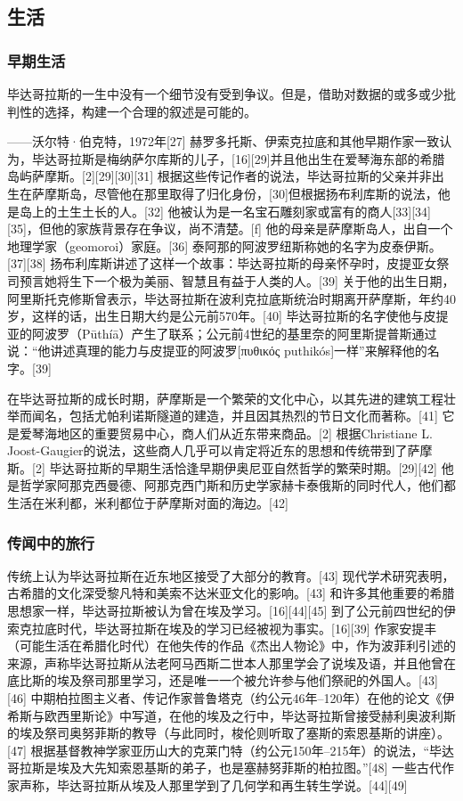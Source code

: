 \subsection{生活}  
\subsubsection{早期生活}  
毕达哥拉斯的一生中没有一个细节没有受到争议。但是，借助对数据的或多或少批判性的选择，构建一个合理的叙述是可能的。

——沃尔特·伯克特，1972年[27]  
赫罗多托斯、伊索克拉底和其他早期作家一致认为，毕达哥拉斯是梅纳萨尔库斯的儿子，[16][29]并且他出生在爱琴海东部的希腊岛屿萨摩斯。[2][29][30][31] 根据这些传记作者的说法，毕达哥拉斯的父亲并非出生在萨摩斯岛，尽管他在那里取得了归化身份，[30]但根据扬布利库斯的说法，他是岛上的土生土长的人。[32] 他被认为是一名宝石雕刻家或富有的商人[33][34][35]，但他的家族背景存在争议，尚不清楚。[f] 他的母亲是萨摩斯岛人，出自一个地理学家（geomoroi）家庭。[36] 泰阿那的阿波罗纽斯称她的名字为皮泰伊斯。[37][38] 扬布利库斯讲述了这样一个故事：毕达哥拉斯的母亲怀孕时，皮提亚女祭司预言她将生下一个极为美丽、智慧且有益于人类的人。[39] 关于他的出生日期，阿里斯托克修斯曾表示，毕达哥拉斯在波利克拉底斯统治时期离开萨摩斯，年约40岁，这样的话，出生日期大约是公元前570年。[40] 毕达哥拉斯的名字使他与皮提亚的阿波罗（Pūthíā）产生了联系；公元前4世纪的基里奈的阿里斯提普斯通过说：“他讲述真理的能力与皮提亚的阿波罗[πυθικός puthikós]一样”来解释他的名字。[39]

在毕达哥拉斯的成长时期，萨摩斯是一个繁荣的文化中心，以其先进的建筑工程壮举而闻名，包括尤帕利诺斯隧道的建造，并且因其热烈的节日文化而著称。[41] 它是爱琴海地区的重要贸易中心，商人们从近东带来商品。[2] 根据Christiane L. Joost-Gaugier的说法，这些商人几乎可以肯定将近东的思想和传统带到了萨摩斯。[2] 毕达哥拉斯的早期生活恰逢早期伊奥尼亚自然哲学的繁荣时期。[29][42] 他是哲学家阿那克西曼德、阿那克西门斯和历史学家赫卡泰俄斯的同时代人，他们都生活在米利都，米利都位于萨摩斯对面的海边。[42]
\subsubsection{传闻中的旅行}
传统上认为毕达哥拉斯在近东地区接受了大部分的教育。[43] 现代学术研究表明，古希腊的文化深受黎凡特和美索不达米亚文化的影响。[43] 和许多其他重要的希腊思想家一样，毕达哥拉斯被认为曾在埃及学习。[16][44][45] 到了公元前四世纪的伊索克拉底时代，毕达哥拉斯在埃及的学习已经被视为事实。[16][39] 作家安提丰（可能生活在希腊化时代）在他失传的作品《杰出人物论》中，作为波菲利引述的来源，声称毕达哥拉斯从法老阿马西斯二世本人那里学会了说埃及语，并且他曾在底比斯的埃及祭司那里学习，还是唯一一个被允许参与他们祭祀的外国人。[43][46] 中期柏拉图主义者、传记作家普鲁塔克（约公元46年–120年）在他的论文《伊希斯与欧西里斯论》中写道，在他的埃及之行中，毕达哥拉斯曾接受赫利奥波利斯的埃及祭司奥努菲斯的教导（与此同时，梭伦则听取了塞斯的索恩基斯的讲座）。[47] 根据基督教神学家亚历山大的克莱门特（约公元150年–215年）的说法，“毕达哥拉斯是埃及大先知索恩基斯的弟子，也是塞赫努菲斯的柏拉图。”[48] 一些古代作家声称，毕达哥拉斯从埃及人那里学到了几何学和再生转生学说。[44][49]

